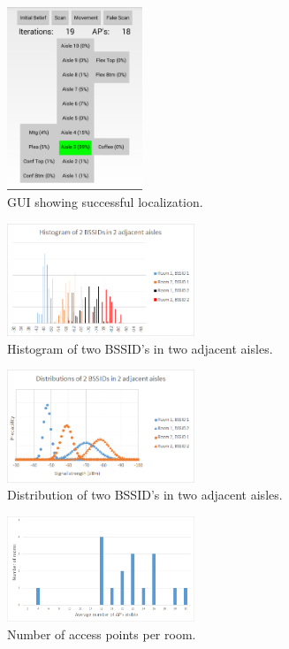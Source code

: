 \documentclass[a4paper,10pt,twoside]{IEEEtran}
\begin{document}
\begin{figure}[h!]
  \centering
    \includegraphics[width=0.36\textwidth]{screenshot}
    \caption{GUI showing successful localization.}
    \label{fig:screenshot}
\end{figure}

\begin{figure}[h!]
  \centering
    \includegraphics[width=0.5\textwidth]{histogram}
    \caption{Histogram of two BSSID's in two adjacent aisles.}
    \label{fig:histogram}
\end{figure}

\begin{figure}[h!]
  \centering
    \includegraphics[width=0.5\textwidth]{distribution}
    \caption{Distribution of two BSSID's in two adjacent aisles.}
    \label{fig:distribution}
\end{figure}

\begin{figure}[h!]
  \centering
    \includegraphics[width=0.5\textwidth]{graph-numberAPperRoom}
    \caption{Number of access points per room.}
    \label{fig:graph-numberAPperRoom}
\end{figure}
\end{document}
